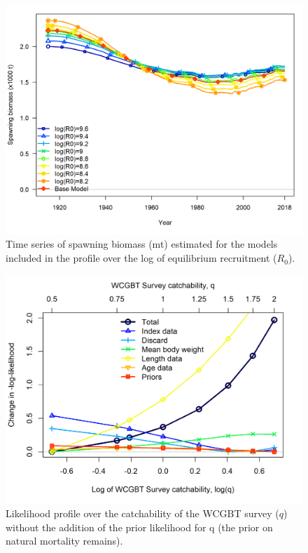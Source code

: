 \documentclass[12pt,]{article}
\begin{document}
\begin{figure}
\centering
\includegraphics{Figures/profile_R0_compare1_spawnbio.png}
\caption{Time series of spawning biomass (mt) estimated for the models
included in the profile over the log of equilibrium recruitment
(\(R_0\)).\label{fig:profile_R0_compare1_spawnbio}}
\end{figure}

\FloatBarrier

\begin{figure}
\centering
\includegraphics{Figures/profile_Q_noprior.png}
\caption{Likelihood profile over the catchability of the WCGBT survey
(\(q\)) without the addition of the prior likelihood for q (the prior on
natural mortality remains).\label{fig:profile_logQ_noprior}}
\end{figure}
\end{document}
